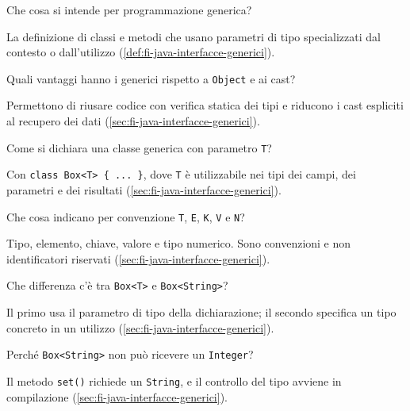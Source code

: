 \begin{exercise}
\label{ex:fi-esercizi-java-interfacce-generici}
Che cosa si intende per programmazione generica?
\end{exercise}

La definizione di classi e metodi che usano parametri di tipo specializzati dal contesto o dall'utilizzo (\cref{def:fi-java-interfacce-generici}).

\begin{exercise}
\label{ex:fi-esercizi-java-interfacce-vantaggi}
Quali vantaggi hanno i generici rispetto a \texttt{Object} e ai cast?
\end{exercise}

Permettono di riusare codice con verifica statica dei tipi e riducono i cast espliciti al recupero dei dati (\cref{sec:fi-java-interfacce-generici}).

\begin{exercise}
\label{ex:fi-esercizi-java-interfacce-sintassi}
Come si dichiara una classe generica con parametro \texttt{T}?
\end{exercise}

Con \lstinline|class Box<T> { ... }|, dove \texttt{T} è utilizzabile nei tipi dei campi, dei parametri e dei risultati (\cref{sec:fi-java-interfacce-generici}).

\begin{exercise}
\label{ex:fi-esercizi-java-interfacce-lettere}
Che cosa indicano per convenzione \texttt{T}, \texttt{E}, \texttt{K}, \texttt{V} e \texttt{N}?
\end{exercise}

Tipo, elemento, chiave, valore e tipo numerico. Sono convenzioni e non identificatori riservati (\cref{sec:fi-java-interfacce-generici}).

\begin{exercise}
\label{ex:fi-esercizi-java-interfacce-box-param}
Che differenza c'è tra \lstinline|Box<T>| e \lstinline|Box<String>|?
\end{exercise}

Il primo usa il parametro di tipo della dichiarazione; il secondo specifica un tipo concreto in un utilizzo (\cref{sec:fi-java-interfacce-generici}).

\begin{exercise}
\label{ex:fi-esercizi-java-interfacce-box-string}
Perché \lstinline|Box<String>| non può ricevere un \texttt{Integer}?
\end{exercise}

Il metodo \texttt{set()} richiede un \texttt{String}, e il controllo del tipo avviene in compilazione (\cref{sec:fi-java-interfacce-generici}).

